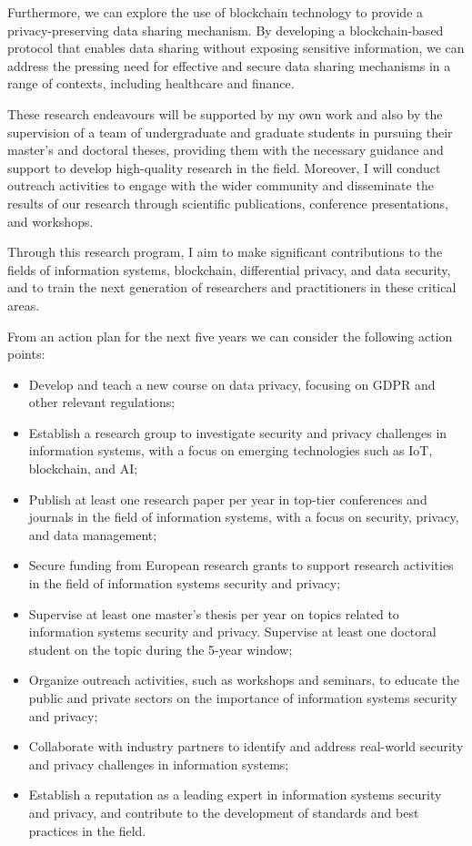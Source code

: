 \documentclass[11pt]{article}
\begin{document}
Furthermore, we can explore the use of blockchain technology to provide a privacy-preserving data sharing mechanism. By developing a blockchain-based protocol that enables data sharing without exposing sensitive information, we can address the pressing need for effective and secure data sharing mechanisms in a range of contexts, including healthcare and finance.

These research endeavours will be supported by my own work and also by the supervision of a team of undergraduate and graduate students in pursuing their master's and doctoral theses, providing them with the necessary guidance and support to develop high-quality research in the field. Moreover, I will conduct outreach activities to engage with the wider community and disseminate the results of our research through scientific publications, conference presentations, and workshops.

Through this research program, I aim to make significant contributions to the fields of information systems, blockchain, differential privacy, and data security, and to train the next generation of researchers and practitioners in these critical areas. 

From an action plan for the next five years we can consider the following action points:

\begin{itemize}
\item Develop and teach a new course on data privacy, focusing on GDPR and other relevant regulations;
\item Establish a research group to investigate security and privacy challenges in information systems, with a focus on emerging technologies such as IoT, blockchain, and AI;
\item Publish at least one research paper per year in top-tier conferences and journals in the field of information systems, with a focus on security, privacy, and data management;
\item Secure funding from European research grants to support research activities in the field of information systems security and privacy;
\item Supervise at least one master's thesis per year on topics related to information systems security and privacy. Supervise at least one doctoral student on the topic during the 5-year window;
\item Organize outreach activities, such as workshops and seminars, to educate the public and private sectors on the importance of information systems security and privacy;
\item Collaborate with industry partners to identify and address real-world security and privacy challenges in information systems;
\item Establish a reputation as a leading expert in information systems security and privacy, and contribute to the development of standards and best practices in the field.
\end{itemize}
\end{document}
